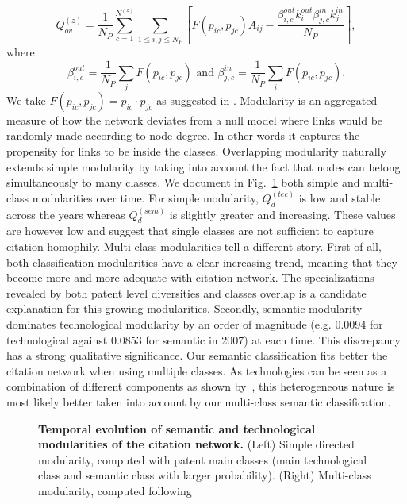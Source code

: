 \documentclass[10pt,A4,draft]{article}
\begin{document}
\[
\displaystyle Q_{ov}^{(z)} = \frac{1}{N_P} \sum_{c = 1}^{N^{(z)}} \sum_{1\leq i,j \leq N_P}\left[F(p_{ic},p_{jc})A_{ij} - \frac{\beta_{i,c}^{out}k_i^{out}\beta_{j,c}^{in}k_j^{in}}{N_P}\right],
\]
where
\[
 \beta_{i,c}^{out} =   \frac{1}{N_P} \displaystyle \sum_j F(p_{ic},p_{jc}) \text{ and } \beta_{j,c}^{in} =  \frac{1}{N_P} \displaystyle \sum_i F(p_{ic},p_{jc}).
\]
We take $F(p_{ic},p_{jc}) = p_{ic}\cdot p_{jc}$ as suggested in \cite{nicosia2009extending}. Modularity is an aggregated measure of how the network deviates from a null model where links would be randomly made according to node degree. In other words it captures the propensity for links to be inside the classes. Overlapping modularity naturally extends simple modularity by taking into account the fact that nodes can belong simultaneously to many classes.
We document in Fig.~\ref{fig:modularities} both simple and multi-class modularities over time. For simple modularity, $Q_d^{(tec)}$ is low and stable across the years whereas $Q_d^{(sem)}$ is slightly greater and increasing. These values are however low and suggest that single classes are not sufficient to capture citation homophily. Multi-class modularities tell a different story. First of all, both classification modularities have a clear increasing trend, meaning that they become more and more adequate with citation network. The specializations revealed by both patent level diversities and classes overlap is a candidate explanation for this growing modularities. Secondly, semantic modularity dominates technological modularity by an order of magnitude (e.g. 0.0094 for technological against 0.0853 for semantic in 2007) at each time. This discrepancy has a strong qualitative significance. Our semantic classification fits better the citation network when using multiple classes. As technologies can be seen as a combination of different components as shown by~\cite{Youn:2015fk}, this heterogeneous nature is most likely better taken into account by our multi-class semantic classification.

\begin{figure}[!ht]
\centering
\caption{\textbf{Temporal evolution of semantic and technological modularities of the citation network.} (Left) Simple directed modularity, computed with patent main classes (main technological class and semantic class with larger probability). (Right) Multi-class modularity, computed following~\cite{nicosia2009extending} }
\label{fig:modularities}
\end{figure}
\end{document}
